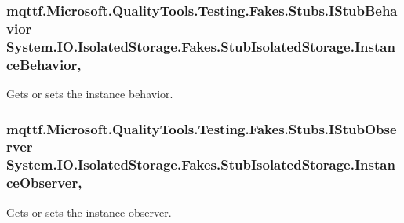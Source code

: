 \hypertarget{class_system_1_1_i_o_1_1_isolated_storage_1_1_fakes_1_1_stub_isolated_storage_a307aa15f2219c2a7a0b4f1cc0b427988}{
\subsubsection[{Instance\-Behavior}]{\setlength{\rightskip}{0pt plus 5cm}mqttf.\-Microsoft.\-Quality\-Tools.\-Testing.\-Fakes.\-Stubs.\-I\-Stub\-Behavior System.\-I\-O.\-Isolated\-Storage.\-Fakes.\-Stub\-Isolated\-Storage.\-Instance\-Behavior\hspace{0.3cm}{\ttfamily [get]}, {\ttfamily [set]}}}\label{class_system_1_1_i_o_1_1_isolated_storage_1_1_fakes_1_1_stub_isolated_storage_a307aa15f2219c2a7a0b4f1cc0b427988}


Gets or sets the instance behavior.

\hypertarget{class_system_1_1_i_o_1_1_isolated_storage_1_1_fakes_1_1_stub_isolated_storage_acd2885af0f1cca57e1543f517647473d}{
\subsubsection[{Instance\-Observer}]{\setlength{\rightskip}{0pt plus 5cm}mqttf.\-Microsoft.\-Quality\-Tools.\-Testing.\-Fakes.\-Stubs.\-I\-Stub\-Observer System.\-I\-O.\-Isolated\-Storage.\-Fakes.\-Stub\-Isolated\-Storage.\-Instance\-Observer\hspace{0.3cm}{\ttfamily [get]}, {\ttfamily [set]}}}\label{class_system_1_1_i_o_1_1_isolated_storage_1_1_fakes_1_1_stub_isolated_storage_acd2885af0f1cca57e1543f517647473d}


Gets or sets the instance observer.

